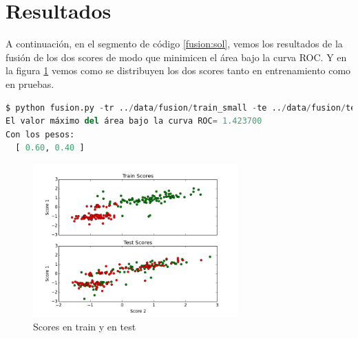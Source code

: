 \section{Resultados}

A continuación, en el segmento de código \ref{fusion:sol}, vemos los resultados de la fusión de los dos scores de modo que minimicen el área bajo la curva ROC. Y en la figura \ref{fig:fusion} vemos como se distribuyen los dos scores tanto en entrenamiento como en pruebas.\par

\begin{lstlisting}[language=python,label=fusion:sol, caption=PCA cuado n es menor d]
$ python fusion.py -tr ../data/fusion/train_small -te ../data/fusion/test_small -p
El valor máximo del área bajo la curva ROC= 1.423700 
Con los pesos:
  [ 0.60, 0.40 ]
\end{lstlisting}

\begin{figure}[h!]
  \centering
      \includegraphics[width=0.7\textwidth]{../fusion/fusion.png}
  \caption{ Scores en train y en test}
  \label{fig:fusion}
\end{figure} 
